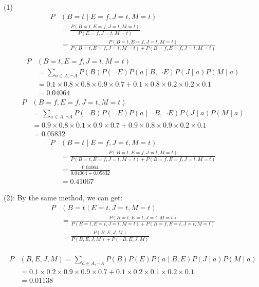\documentclass[a4paper]{article}
\theoremstyle{definition}
\newenvironment{soln}{
	\leavevmode\color{blue}\ignorespaces
}{}
\begin{document}
\begin{soln}
\\
(1)
\begin{align*}
	P&(B=t \mid E=f, J=t, M=t) \\
	&= \frac{P(B=t, E=f, J=t, M=t)}{P(E=f, J=t, M=t)} \\
	&= \frac{P(B=t, E=f, J=t, M=t)}{P(B=t, E=f, J=t, M=t) + P(B=f, E=f, J=t, M=t)} \\
\end{align*}
\begin{align*}
P&(B=t, E=f, J=t, M=t) \\
&= \sum_{a \in A, \neg A} P(B) P(\neg E) P(a \mid B, \neg E) P(J \mid a) P(M \mid a) \\
&= 0.1 \times 0.8 \times 0.8 \times 0.9 \times 0.7 + 0.1 \times 0.8 \times 0.2 \times 0.2 \times 0.1 \\
&= 0.04064
\end{align*}
\begin{align*}
P&(B=f, E=f, J=t, M=t) \\
&= \sum_{a \in A, \neg A} P(\neg B) P(\neg E) P(a \mid \neg B, \neg E) P(J \mid a) P(M \mid a) \\
&= 0.9 \times 0.8 \times 0.1 \times 0.9 \times 0.7 + 0.9 \times 0.8 \times 0.9 \times 0.2 \times 0.1 \\
&= 0.05832
\end{align*}
\begin{align*}
	P&(B=t \mid E=f, J=t, M=t) \\
	&= \frac{P(B=t, E=f, J=t, M=t)}{P(B=t, E=f, J=t, M=t) + P(B=f, E=f, J=t, M=t)} \\
	&= \frac{0.04064}{0.04064 + 0.05832} \\&= 0.41067
\end{align*}

(2): By the same method, we can get:
\begin{align*}
	P&(B=t \mid E=t, J=t, M=t) \\
	&= \frac{P(B=t, E=t, J=t, M=t)}{P(B=t, E=t, J=t, M=t) + P(B=f, E=t, J=t, M=t)} \\
	&= \frac{P(B,E,J,M)}{P(B,E,J,M) + P(\neg B,E,J,M)} \\
\end{align*}

\begin{align*}
P&(B,E,J,M) = \sum_{a \in A, \neg A} P(B) P(E) P(a \mid B, E) P(J \mid a) P(M \mid a)\\
&= 0.1 \times 0.2 \times 0.9 \times 0.9 \times 0.7 + 0.1 \times 0.2 \times 0.1 \times 0.2 \times 0.1 \\
&= 0.01138
\end{align*}


\end{soln}
\end{document}

